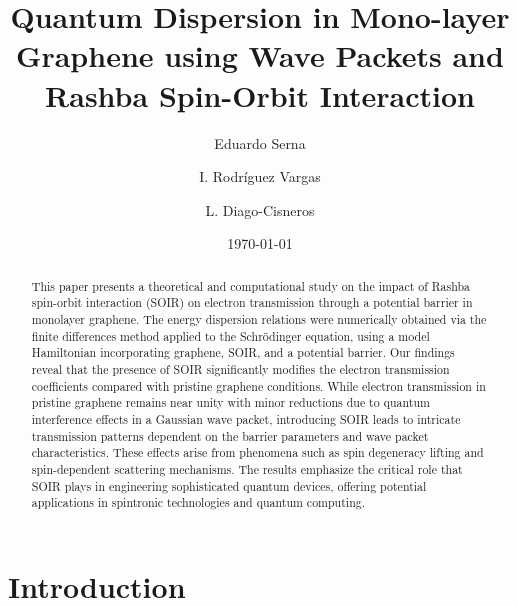 \documentclass[twocolumn, aps, prb, 10pt]{revtex4-2}
\begin{document}
    \title{Quantum Dispersion in Mono-layer Graphene using Wave Packets and Rashba Spin-Orbit Interaction}
    \author{Eduardo Serna}
    \author{I. Rodríguez Vargas}
    \author{L. Diago-Cisneros}
    \date{\today}


    \begin{abstract}
        This paper presents a theoretical and computational study on the impact of Rashba spin-orbit interaction (SOIR) on electron transmission through a potential barrier in monolayer graphene.
        The energy dispersion relations were numerically obtained via the finite differences method applied to the Schrödinger equation, using a model Hamiltonian incorporating graphene, SOIR, and a potential barrier.
        Our findings reveal that the presence of SOIR significantly modifies the electron transmission coefficients compared with pristine graphene conditions.
        While electron transmission in pristine graphene remains near unity with minor reductions due to quantum interference effects in a Gaussian wave packet, introducing SOIR leads to intricate transmission patterns dependent on the barrier parameters and wave packet characteristics.
        These effects arise from phenomena such as spin degeneracy lifting and spin-dependent scattering mechanisms.
        The results emphasize the critical role that SOIR plays in engineering sophisticated quantum devices, offering potential applications in spintronic technologies and quantum computing.
    \end{abstract}

    \maketitle




    \section{Introduction}\label{sec:introduction}
    
\end{document}
